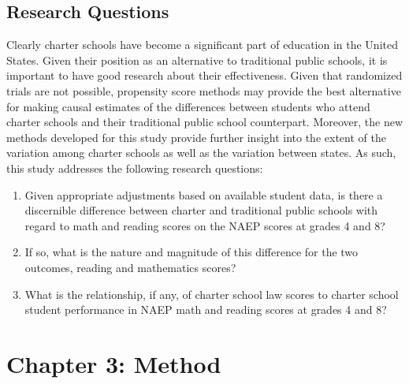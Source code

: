 \documentclass[letterpaper,12p,twoside]{article} %
\begin{document}
\subsection{Research Questions}

Clearly charter schools have become a significant part of education in the United States. Given their position as an alternative to traditional public schools, it is important to have good research about their effectiveness. Given that randomized trials are not possible, propensity score methods may provide the best alternative for making causal estimates of the differences between students who attend charter schools and their traditional public school counterpart. Moreover, the new methods developed for this study provide further insight into the extent of the variation among charter schools as well as the variation between states. As such, this study addresses the following research questions:

\begin{enumerate}
\item Given appropriate adjustments based on available student data, is there a discernible difference between charter and traditional public schools with regard to math and reading scores on the NAEP scores at grades 4 and 8? 
\item If so, what is the nature and magnitude of this difference for the two outcomes, reading and mathematics scores?  
\item What is the relationship, if any, of charter school law scores to charter school student performance in NAEP math and reading scores at grades 4 and 8?  
\end{enumerate}

\cleardoublepage
\section{Chapter 3: Method}
\end{document}
